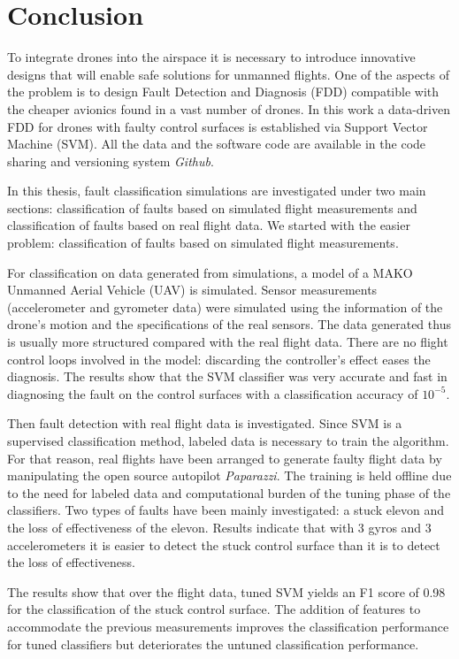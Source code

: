 \chapter{Conclusion}

To integrate drones into the airspace it is necessary to introduce innovative designs that will enable safe solutions for unmanned flights. One of the aspects of the problem is to design Fault Detection and Diagnosis (FDD) compatible with the cheaper avionics found in a vast number of drones.
In this work a data-driven FDD for drones with faulty control surfaces is established via Support Vector Machine (SVM). All the data and the software code are available in the code sharing and versioning system \emph{Github}. 

In this thesis, fault classification simulations are investigated under two main sections: classification of faults based on simulated flight measurements and classification of faults based on real flight data. We started with the easier problem: classification of faults based on simulated flight measurements.

For classification on data generated from simulations, a model of a MAKO Unmanned Aerial Vehicle (UAV) is simulated.
Sensor measurements (accelerometer and gyrometer data) were simulated using the information of the drone's motion and the specifications of the real sensors. 
The data generated thus is usually more structured compared with the real flight data.
There are no flight control loops involved in the model: discarding the controller's effect eases the diagnosis. 
The results show that the SVM classifier was very accurate and fast in diagnosing the fault on the control surfaces with a classification accuracy of $10^{-5}$.

Then fault detection with real flight data is investigated. 
Since SVM is a supervised classification method, labeled data is necessary to train the algorithm. For that reason, real flights have been arranged to generate faulty flight data by manipulating the open source autopilot \emph{Paparazzi}.  
The training is held offline due to the need for labeled data and computational burden of the tuning phase of the classifiers. 
Two types of faults have been mainly investigated: a stuck elevon and the loss of effectiveness of the elevon. Results indicate that with 3 gyros and 3 accelerometers it is easier to detect the stuck control surface than it is to detect the loss of effectiveness. 

The results show that over the flight data, tuned SVM yields an F1 score of 0.98 for the classification of the stuck control surface. 
The addition of features to accommodate the previous measurements improves the classification performance for tuned classifiers but deteriorates the untuned classification performance. 

